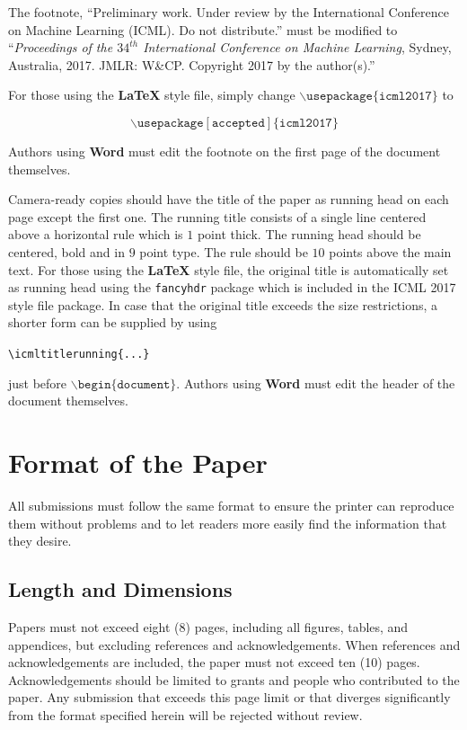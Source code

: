 \documentclass{article}
\begin{document}
The footnote, ``Preliminary work.  Under review by the International
Conference on Machine Learning (ICML).  Do not distribute.'' must be
modified to ``\textit{Proceedings of the
$\mathit{34}^{th}$ International Conference on Machine Learning},
Sydney, Australia, 2017.  JMLR: W\&CP. 
Copyright 2017 by the author(s).''

For those using the \textbf{\LaTeX} style file, simply change
$\mathtt{\backslash usepackage\{icml2017\}}$ to 

$$\mathtt{\backslash usepackage[accepted]\{icml2017\}}$$

\noindent
Authors using \textbf{Word} must edit the
footnote on the first page of the document themselves.

Camera-ready copies should have the title of the paper as running head
on each page except the first one.  The running title consists of a
single line centered above a horizontal rule which is $1$ point thick.
The running head should be centered, bold and in $9$ point type.  The
rule should be $10$ points above the main text.  For those using the
\textbf{\LaTeX} style file, the original title is automatically set as running
head using the {\tt fancyhdr} package which is included in the ICML
2017 style file package.  In case that the original title exceeds the
size restrictions, a shorter form can be supplied by using

\verb|\icmltitlerunning{...}|

just before $\mathtt{\backslash begin\{document\}}$.
Authors using \textbf{Word} must edit the header of the document themselves.

\section{Format of the Paper} 
 
All submissions must follow the same format to ensure the printer can
reproduce them without problems and to let readers more easily find
the information that they desire.

\subsection{Length and Dimensions}

Papers must not exceed eight (8) pages, including all figures, tables,
and appendices, but excluding references and acknowledgements. When references and acknowledgements are included,
the paper must not exceed ten (10) pages.
Acknowledgements should be limited to grants and people who contributed to the paper.
Any submission that exceeds 
this page limit or that diverges significantly from the format specified 
herein will be rejected without review.
\end{document}
